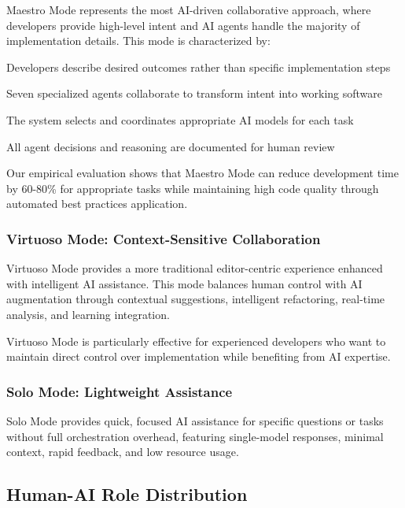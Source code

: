 Maestro Mode represents the most AI-driven collaborative approach, where developers provide high-level intent and AI agents handle the majority of implementation details. This mode is characterized by:

\begin{description}[leftmargin=3cm,labelwidth=2.5cm]
    \item[\textbf{Intent-Based Input}] Developers describe desired outcomes rather than specific implementation steps
    \item[\textbf{Multi-Agent Coordination}] Seven specialized agents collaborate to transform intent into working software
    \item[\textbf{Automatic Model Selection}] The system selects and coordinates appropriate AI models for each task
    \item[\textbf{Transparent Process}] All agent decisions and reasoning are documented for human review
\end{description}

Our empirical evaluation shows that Maestro Mode can reduce development time by 60-80\% for appropriate tasks while maintaining high code quality through automated best practices application.

\subsubsection{Virtuoso Mode: Context-Sensitive Collaboration}

Virtuoso Mode provides a more traditional editor-centric experience enhanced with intelligent AI assistance. This mode balances human control with AI augmentation through contextual suggestions, intelligent refactoring, real-time analysis, and learning integration.

Virtuoso Mode is particularly effective for experienced developers who want to maintain direct control over implementation while benefiting from AI expertise.

\subsubsection{Solo Mode: Lightweight Assistance}

Solo Mode provides quick, focused AI assistance for specific questions or tasks without full orchestration overhead, featuring single-model responses, minimal context, rapid feedback, and low resource usage.

\subsection{Human-AI Role Distribution}

